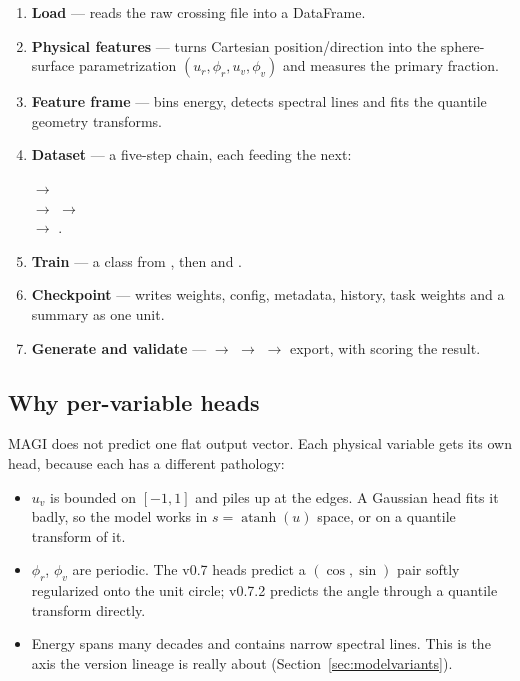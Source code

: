 \documentclass[11pt,a4paper]{article}
\begin{document}
\begin{enumerate}[nosep]
  \item \textbf{Load} ---  reads the raw crossing
    file into a DataFrame.
  \item \textbf{Physical features} ---  turns
    Cartesian position/direction into the sphere-surface parametrization
    $(u_r, \phi_r, u_v, \phi_v)$ and measures the primary fraction.
  \item \textbf{Feature frame} ---  bins
    energy, detects spectral lines and fits the quantile geometry transforms.
  \item \textbf{Dataset} --- a five-step chain, each feeding the next:
    \begin{flushleft}\small
     $\rightarrow$\\
     $\rightarrow$
     $\rightarrow$\\
     $\rightarrow$
    .
    \end{flushleft}
  \item \textbf{Train} --- a class from , then
     and .
  \item \textbf{Checkpoint} ---  writes
    weights, config, metadata, history, task weights and a summary as one unit.
  \item \textbf{Generate and validate} --- 
    $\rightarrow$  $\rightarrow$
     $\rightarrow$ export, with
     scoring the result.
\end{enumerate}

\subsection{Why per-variable heads}

MAGI does not predict one flat output vector. Each physical variable gets its
own head, because each has a different pathology:

\begin{itemize}[nosep]
  \item $u_v$ is bounded on $[-1,1]$ and piles up at the edges. A Gaussian head
    fits it badly, so the model works in $s = \operatorname{atanh}(u)$ space,
    or on a quantile transform of it.
  \item $\phi_r$, $\phi_v$ are periodic. The v0.7 heads predict a
    $(\cos,\sin)$ pair softly regularized onto the unit circle; v0.7.2 predicts
    the angle through a quantile transform directly.
  \item Energy spans many decades and contains narrow spectral lines. This is
    the axis the version lineage is really about
    (Section~\ref{sec:modelvariants}).
\end{itemize}
\end{document}
